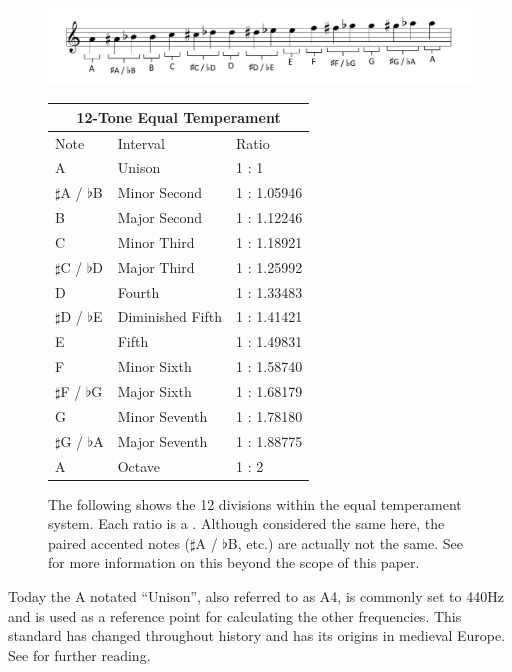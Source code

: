 \documentclass[10pt]{article}
\begin{document}
\begin{figure}[h]
	\centering
     \includegraphics[width=1\textwidth]{MusicalScale}
     \vspace{2mm}
     \begin{tabular}{ |p{1.5cm}|p{3cm}|p{2cm}|  }
		\hline
		\multicolumn{3}{|c|}{12-Tone Equal Temperament} \\
 		\hline
 		Note & Interval & Ratio \\
 		\hline
 		A & Unison & 1 : 1 \\
 		$\sharp$A / $\flat$B & Minor Second & 1 : 1.05946 \\
 		B & Major Second & 1 : 1.12246 \\
 		C & Minor Third & 1 : 1.18921 \\
 		$\sharp$C / $\flat$D & Major Third & 1 : 1.25992 \\
 		D & Fourth & 1 : 1.33483 \\
 		$\sharp$D / $\flat$E & Diminished Fifth & 1 : 1.41421 \\
 		E & Fifth & 1 : 1.49831 \\
 		F & Minor Sixth & 1 : 1.58740 \\
 		$\sharp$F / $\flat$G & Major Sixth & 1 : 1.68179 \\
 		G & Minor Seventh & 1 : 1.78180 \\
 		$\sharp$G / $\flat$A & Major Seventh & 1 : 1.88775 \\
 		A & Octave & 1 : 2 \\
 		\hline
	\end{tabular}
     \caption{The following shows the 12 divisions within the equal temperament system. Each ratio is a  \cite{boatwright1956musictheory} \cite{intervalChart}. Although considered the same here, the paired accented notes ($\sharp$A / $\flat$B, etc.) are actually not the same. See \cite{tuningSystems} for more information on this beyond the scope of this paper.} 
     \label{fig:equal temperament}
\end{figure}

Today the A notated ``Unison'', also referred to as A4, is commonly set to 440Hz and is used as a reference point for calculating the other frequencies. This standard has changed throughout history and has its origins in medieval Europe. See \cite{a440why} for further reading. 
\end{document}
